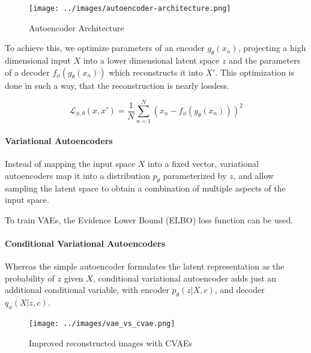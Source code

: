 \documentclass[a4paper,10pt,twocolumn]{article}
\begin{document}
            \begin{figure}[H]
                \centering
                \texttt{[image: ../images/autoencoder-architecture.png]}
                \caption{Autoencoder Architecture}\label{fig:autoencoder}
            \end{figure}

            To achieve this, we optimize parameters of an encoder $g_{\theta} ({x_n})$, 
            projecting a high dimensional input $X$ into a lower dimensional latent space $z$ 
            and the parameters of a decoder $f_{\phi} (g_{\theta} ({x_n}))$ which reconstructs it into $X'$.
            This optimization is done in such a way, that the reconstruction is nearly lossless.

            \begin{equation}
                \mathcal{L}_{\phi, \theta}({x}, {x'}) = \frac{1}{N} \sum_{n=1}^{N} {({x_n} - f_{\phi} (g_{\theta} ({x_n})))}^2
                \label{eq:lossfunc}
            \end{equation}
            
            \paragraph{Variational Autoencoders}
            Instead of mapping the input space $X$ into a fixed vector, variational autoencoders
            map it into a distribution $p_\theta$ parameterized by $z$\cite{rocca_vaes},
            and allow sampling the latent space to obtain a combination of multiple aspects of the input space.
            
            To train VAEs, the Evidence Lower Bound (ELBO) loss function can be used.

            \paragraph{Conditional Variational Autoencoders}
            Whereas the simple autoencoder formulates the latent representation as the probability of
            $z$ given $X$, conditional variational autoencoder adds just an additional conditional variable, 
            with encoder $p_\theta (z | X, c)$, and decoder $q_\phi (X | z, c)$\cite{cvaes}.

            \begin{figure}[H]
                \centering
                \texttt{[image: ../images/vae\_vs\_cvae.png]}
                \caption{Improved reconstructed images with CVAEs}\label{fig:vae_vs_cvae}
            \end{figure}
\end{document}
